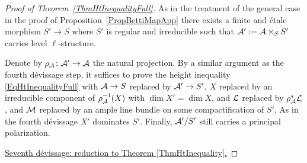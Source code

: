 \begin{proof}[Proof of Theorem~\ref{ThmHtInequalityFull}]
As in the treatment of the general case in the proof of
Proposition~\ref{PropBettiMapApp}
there exists a finite and \'etale morphism $S'\rightarrow S$ where
$S'$ is regular and irreducible
 such that $\mathcal{A}' := \mathcal{A}\times_S S'$ carries level $\ell$-structure.


Denote by $\rho_{\mathcal{A}} \colon \mathcal{A}' \rightarrow \mathcal{A}$ the natural
projection. By a similar argument as the fourth d\'{e}vissage step, it
suffices to prove the height inequality \eqref{EqHtInequalityFull} with
$\mathcal{A} \rightarrow S$ replaced by $\mathcal{A}' \rightarrow S'$, $X$ replaced by
an irreducible component of $\rho_{\mathcal{A}}^{-1}(X)$ with $\dim X'=\dim
X$, and ${\mathcal L}$ replaced by $\rho_{\mathcal{A}}^*{\mathcal L}$, and ${\mathcal M}$ replaced by
an ample line bundle on some compactification of $S'$.
  As in the fourth d\'evissage  $X'$ dominates $S'$. Finally,
  $\mathcal{A}'/S'$ still carries a principal polarization.


\ul{Seventh d\'{e}vissage: reduction to  Theorem {\ref{ThmHtInequality}}.}


\end{proof}
